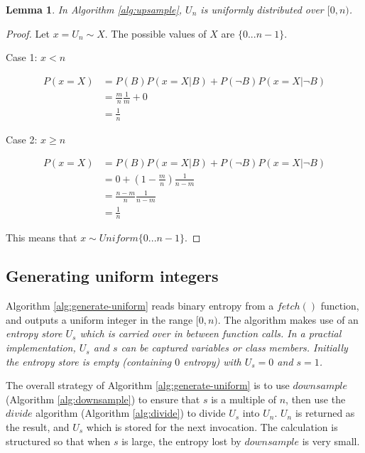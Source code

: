 \documentclass[12pt]{article}
\newtheorem{lemma}{Lemma}
\begin{document}
\begin{lemma}
In Algorithm \ref{alg:upsample}, $U_{n}$ is uniformly distributed over $[0,n)$.
\end{lemma}

\begin{proof}
Let $x = U_{n} \sim X$. The possible values of $X$ are $\{0 ... n-1\}$.

Case 1: $x<n$

\begin{align}
P(x=X) & = P(B)P(x=X|B) + P(\neg B)P(x=X|\neg B) \\
       & = \frac{m}{n}\frac{1}{m} + 0 \\
       & = \frac{1}{n}
\end{align}

Case 2: $x \ge n$

\begin{align}
P(x=X) & = P(B)P(x=X|B) + P(\neg B)P(x=X|\neg B) \\
       & = 0 + (1 - \frac{m}{n})\frac{1}{n-m}  \\
       & = \frac{n - m}{n}\frac{1}{n-m} \\
       & = \frac{1}{n}
\end{align}

This means that $x \sim Uniform\{0...n-1\}$.
\end{proof}

\subsection{Generating uniform integers}

Algorithm \ref{alg:generate-uniform} reads binary entropy from a $fetch()$ function, and outputs a uniform integer in the range $[0,n)$. The algorithm makes use of an \em entropy store \em $U_s$ which is carried over in between function calls. In a practial implementation, $U_s$ and $s$ can be captured variables or class members. Initially the entropy store is empty (containing $0$ entropy) with $U_s = 0$ and $s=1$.

The overall strategy of Algorithm \ref{alg:generate-uniform} is to use $downsample$ (Algorithm \ref{alg:downsample}) to ensure that $s$ is a multiple of $n$, then use the $divide$ algorithm (Algorithm \ref{alg:divide}) to divide $U_s$ into $U_n$. $U_n$ is returned as the result, and $U_s$ which is stored for the next invocation. The calculation is structured so that when $s$ is large, the entropy lost by $downsample$ is very small.
\end{document}
